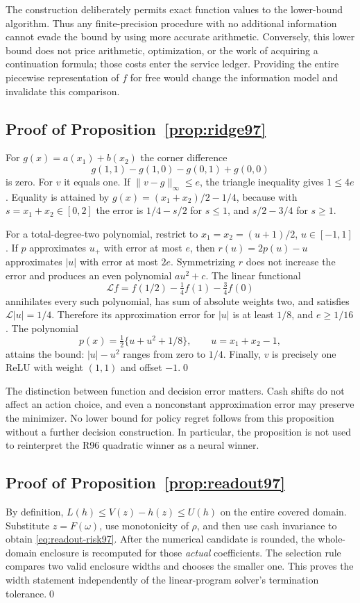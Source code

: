 The construction deliberately permits exact function values to the lower-bound algorithm. Thus any finite-precision procedure with no additional information cannot evade the bound by using more accurate arithmetic. Conversely, this lower bound does not price arithmetic, optimization, or the work of acquiring a continuation formula; those costs enter the service ledger. Providing the entire piecewise representation of $f$ for free would change the information model and invalidate this comparison.

\subsection{Proof of Proposition~\ref{prop:ridge97}}
For $g(x)=a(x_1)+b(x_2)$ the corner difference
\[
 g(1,1)-g(1,0)-g(0,1)+g(0,0)
\]
is zero. For $v$ it equals one. If $\|v-g\|_\infty\leq e$, the triangle inequality gives $1\leq4e$. Equality is attained by $g(x)=(x_1+x_2)/2-1/4$, because with $s=x_1+x_2\in[0,2]$ the error is $1/4-s/2$ for $s\leq1$, and $s/2-3/4$ for $s\geq1$.

For a total-degree-two polynomial, restrict to $x_1=x_2=(u+1)/2$, $u\in[-1,1]$. If $p$ approximates $u_+$ with error at most $e$, then $r(u)=2p(u)-u$ approximates $|u|$ with error at most $2e$. Symmetrizing $r$ does not increase the error and produces an even polynomial $a u^2+c$. The linear functional
\[
 \mathcal L f=f(1/2)-\tfrac14 f(1)-\tfrac34 f(0)
\]
annihilates every such polynomial, has sum of absolute weights two, and satisfies $\mathcal L|u|=1/4$. Therefore its approximation error for $|u|$ is at least $1/8$, and $e\geq1/16$. The polynomial
\[
 p(x)=\tfrac12\{u+u^2+1/8\},\qquad u=x_1+x_2-1,
\]
attains the bound: $|u|-u^2$ ranges from zero to $1/4$. Finally, $v$ is precisely one ReLU with weight $(1,1)$ and offset $-1$.\qed

The distinction between function and decision error matters. Cash shifts do not affect an action choice, and even a nonconstant approximation error may preserve the minimizer. No lower bound for policy regret follows from this proposition without a further decision construction. In particular, the proposition is not used to reinterpret the R96 quadratic winner as a neural winner.

\subsection{Proof of Proposition~\ref{prop:readout97}}
By definition, $L(h)\leq V(z)-h(z)\leq U(h)$ on the entire covered domain. Substitute $z=F(\omega)$, use monotonicity of $\rho$, and then use cash invariance to obtain \eqref{eq:readout-risk97}. After the numerical candidate is rounded, the whole-domain enclosure is recomputed for those \emph{actual} coefficients. The selection rule compares two valid enclosure widths and chooses the smaller one. This proves the width statement independently of the linear-program solver's termination tolerance.\qed

